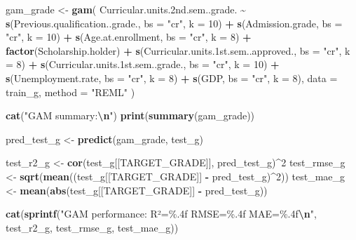 \documentclass[
]{article}
\newenvironment{Shaded}{\begin{snugshade}}{\end{snugshade}}
\newcommand{\AttributeTok}[1]{\textcolor[rgb]{0.13,0.29,0.53}{#1}}
\newcommand{\DecValTok}[1]{\textcolor[rgb]{0.00,0.00,0.81}{#1}}
\newcommand{\FloatTok}[1]{\textcolor[rgb]{0.00,0.00,0.81}{#1}}
\newcommand{\FunctionTok}[1]{\textcolor[rgb]{0.13,0.29,0.53}{\textbf{#1}}}
\newcommand{\NormalTok}[1]{#1}
\newcommand{\OtherTok}[1]{\textcolor[rgb]{0.56,0.35,0.01}{#1}}
\newcommand{\SpecialCharTok}[1]{\textcolor[rgb]{0.81,0.36,0.00}{\textbf{#1}}}
\newcommand{\StringTok}[1]{\textcolor[rgb]{0.31,0.60,0.02}{#1}}
\begin{document}
\begin{Shaded}
\begin{Highlighting}[]
\NormalTok{gam\_grade }\OtherTok{\textless{}{-}} \FunctionTok{gam}\NormalTok{(}
\NormalTok{  Curricular.units}\FloatTok{.2}\NormalTok{nd.sem..grade. }\SpecialCharTok{\textasciitilde{}}
    \FunctionTok{s}\NormalTok{(Previous.qualification..grade., }\AttributeTok{bs =} \StringTok{"cr"}\NormalTok{, }\AttributeTok{k =} \DecValTok{10}\NormalTok{) }\SpecialCharTok{+}
    \FunctionTok{s}\NormalTok{(Admission.grade, }\AttributeTok{bs =} \StringTok{"cr"}\NormalTok{, }\AttributeTok{k =} \DecValTok{10}\NormalTok{) }\SpecialCharTok{+}
    \FunctionTok{s}\NormalTok{(Age.at.enrollment, }\AttributeTok{bs =} \StringTok{"cr"}\NormalTok{, }\AttributeTok{k =} \DecValTok{8}\NormalTok{) }\SpecialCharTok{+}
    \FunctionTok{factor}\NormalTok{(Scholarship.holder) }\SpecialCharTok{+}
    \FunctionTok{s}\NormalTok{(Curricular.units}\FloatTok{.1}\NormalTok{st.sem..approved., }\AttributeTok{bs =} \StringTok{"cr"}\NormalTok{, }\AttributeTok{k =} \DecValTok{8}\NormalTok{) }\SpecialCharTok{+}
    \FunctionTok{s}\NormalTok{(Curricular.units}\FloatTok{.1}\NormalTok{st.sem..grade., }\AttributeTok{bs =} \StringTok{"cr"}\NormalTok{, }\AttributeTok{k =} \DecValTok{10}\NormalTok{) }\SpecialCharTok{+}
    \FunctionTok{s}\NormalTok{(Unemployment.rate, }\AttributeTok{bs =} \StringTok{"cr"}\NormalTok{, }\AttributeTok{k =} \DecValTok{8}\NormalTok{) }\SpecialCharTok{+}
    \FunctionTok{s}\NormalTok{(GDP, }\AttributeTok{bs =} \StringTok{"cr"}\NormalTok{, }\AttributeTok{k =} \DecValTok{8}\NormalTok{),}
  \AttributeTok{data =}\NormalTok{ train\_g,}
  \AttributeTok{method =} \StringTok{"REML"}
\NormalTok{)}

\FunctionTok{cat}\NormalTok{(}\StringTok{"GAM summary:}\SpecialCharTok{\textbackslash{}n}\StringTok{"}\NormalTok{)}
\FunctionTok{print}\NormalTok{(}\FunctionTok{summary}\NormalTok{(gam\_grade))}

\NormalTok{pred\_test\_g }\OtherTok{\textless{}{-}} \FunctionTok{predict}\NormalTok{(gam\_grade, test\_g)}

\NormalTok{test\_r2\_g }\OtherTok{\textless{}{-}} \FunctionTok{cor}\NormalTok{(test\_g[[TARGET\_GRADE]], pred\_test\_g)}\SpecialCharTok{\^{}}\DecValTok{2}
\NormalTok{test\_rmse\_g }\OtherTok{\textless{}{-}} \FunctionTok{sqrt}\NormalTok{(}\FunctionTok{mean}\NormalTok{((test\_g[[TARGET\_GRADE]] }\SpecialCharTok{{-}}\NormalTok{ pred\_test\_g)}\SpecialCharTok{\^{}}\DecValTok{2}\NormalTok{))}
\NormalTok{test\_mae\_g }\OtherTok{\textless{}{-}} \FunctionTok{mean}\NormalTok{(}\FunctionTok{abs}\NormalTok{(test\_g[[TARGET\_GRADE]] }\SpecialCharTok{{-}}\NormalTok{ pred\_test\_g))}

\FunctionTok{cat}\NormalTok{(}\FunctionTok{sprintf}\NormalTok{(}\StringTok{"GAM performance: R²=\%.4f RMSE=\%.4f MAE=\%.4f}\SpecialCharTok{\textbackslash{}n}\StringTok{"}\NormalTok{,}
\NormalTok{            test\_r2\_g, test\_rmse\_g, test\_mae\_g))}
\end{Highlighting}
\end{Shaded}
\end{document}
